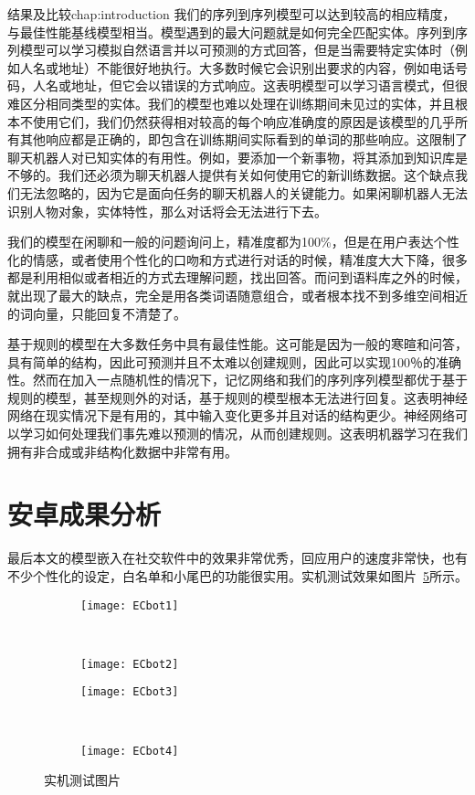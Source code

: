 \begin{cuzchapter}{结果及比较}{chap:introduction}
我们的序列到序列模型可以达到较高的相应精度，与最佳性能基线模型相当。模型遇到的最大问题就是如何完全匹配实体。序列到序列模型可以学习模拟自然语言并以可预测的方式回答，但是当需要特定实体时（例如人名或地址）不能很好地执行。大多数时候它会识别出要求的内容，例如电话号码，人名或地址，但它会以错误的方式响应。这表明模型可以学习语言模式，但很难区分相同类型的实体。我们的模型也难以处理在训练期间未见过的实体，并且根本不使用它们，我们仍然获得相对较高的每个响应准确度的原因是该模型的几乎所有其他响应都是正确的，即包含在训练期间实际看到的单词的那些响应。这限制了聊天机器人对已知实体的有用性。例如，要添加一个新事物，将其添加到知识库是不够的。我们还必须为聊天机器人提供有关如何使用它的新训练数据。这个缺点我们无法忽略的，因为它是面向任务的聊天机器人的关键能力。如果闲聊机器人无法识别人物对象，实体特性，那么对话将会无法进行下去。

我们的模型在闲聊和一般的问题询问上，精准度都为100\%，但是在用户表达个性化的情感，或者使用个性化的口吻和方式进行对话的时候，精准度大大下降，很多都是利用相似或者相近的方式去理解问题，找出回答。而问到语料库之外的时候，就出现了最大的缺点，完全是用各类词语随意组合，或者根本找不到多维空间相近的词向量，只能回复不清楚了。

基于规则的模型在大多数任务中具有最佳性能。这可能是因为一般的寒暄和问答，具有简单的结构，因此可预测并且不太难以创建规则，因此可以实现100％的准确性。然而在加入一点随机性的情况下，记忆网络和我们的序列序列模型都优于基于规则的模型，甚至规则外的对话，基于规则的模型根本无法进行回复。这表明神经网络在现实情况下是有用的，其中输入变化更多并且对话的结构更少。神经网络可以学习如何处理我们事先难以预测的情况，从而创建规则。这表明机器学习在我们拥有非合成或非结构化数据中非常有用。

\section{安卓成果分析}\label{sec:background}
最后本文的模型嵌入在社交软件中的效果非常优秀，回应用户的速度非常快，也有不少个性化的设定，白名单和小尾巴的功能很实用。实机测试效果如图片~\ref{fig:ECbot}所示。
\begin{figure}[!htbp]
    \centering
    \begin{subfigure}[b]{0.4\textwidth}
      \texttt{[image: ECbot1]}
      \caption{}
      \label{fig:ECbot1}
    \end{subfigure}%
    ~%
    \begin{subfigure}[b]{0.4\textwidth}
      \texttt{[image: ECbot2]}
      \caption{}
      \label{fig:ECbot2}
    \end{subfigure}
    \begin{subfigure}[b]{0.4\textwidth}
      \texttt{[image: ECbot3]}
      \caption{}
      \label{fig:ECbot3}
    \end{subfigure}%
    ~%
    \begin{subfigure}[b]{0.4\textwidth}
      \texttt{[image: ECbot4]}
      \caption{}
      \label{fig:ECbot4}
    \end{subfigure}
    \caption[总声压级]{实机测试图片}
    \label{fig:ECbot}
\end{figure}


\end{cuzchapter}

